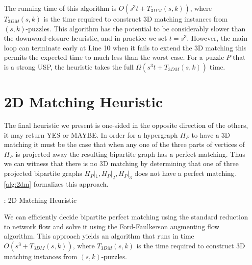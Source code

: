 \documentclass[11pt]{article}
\begin{document}
The running time of this algorithm is $O(s^3 t + T_{3DM}(s,k))$, where
$T_{3DM}(s,k)$ is the time required to construct 3D matching instances
from $(s,k)$-puzzles.  This algorithm has the potential to be
considerably slower than the downward-closure heuristic, and in
practice we set $t = s^3$.  However, the main loop can terminate early
at Line 10 when it fails to extend the 3D matching this permits the
expected time to much less than the worst case.  For a puzzle $P$ that
is a strong USP, the heuristic takes the full $\Omega(s^3 t +
T_{3DM}(s,k))$ time.





\section{2D Matching Heuristic}

\label{app:2dmatching}

The final heuristic we present is one-sided in the opposite direction
of the others, it may return YES or MAYBE.  In order for a hypergraph
$H_P$ to have a 3D matching it must be the case that when any one of
the three parts of vertices of $H_P$ is projected away the resulting
bipartite graph has a perfect matching.  Thus we can witness that
there is no 3D matching by determining that one of three projected
bipartite graphs $H_P|_1, H_P|_2, H_P|_3$ does not have a perfect
matching.  \autoref{alg:2dm} formalizes this approach.

\begin{algorithm}[h]
  \caption{: 2D Matching Heuristic}
  \label{alg:2dm}
\begin{algorithmic}[1]

  \Else
  \EndIf
  \EndFunction
\end{algorithmic}
\end{algorithm}

We can efficiently decide bipartite perfect matching using the
standard reduction to network flow and solve it using the
Ford-Faulkerson augmenting flow algorithm.  This approach yields an
algorithm that runs in time $O(s^3 + T_{3DM}(s,k))$, where
$T_{3DM}(s,k)$ is the time required to construct 3D matching instances
from $(s,k)$-puzzles.
\end{document}
